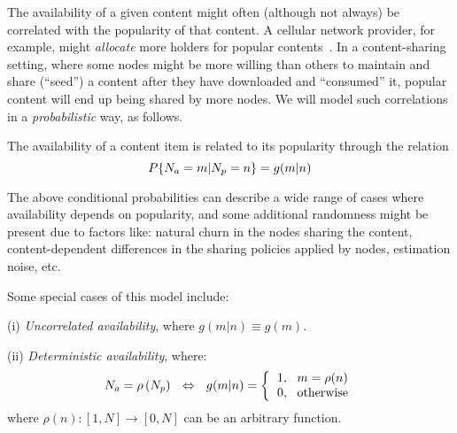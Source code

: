 \documentclass[journal]{IEEEtran}
\begin{document}
The availability of a given content might often (although not always) be correlated with the popularity of that content. A cellular network provider, for example, might \textit{allocate} more holders for popular contents~\cite{multiple-offloading}. In a content-sharing setting, where some nodes might be more willing than others to maintain and share (``seed'') a content after they have downloaded and ``consumed'' it, popular content will end up being shared by more nodes. We will model such correlations in a \textit{probabilistic} way, as follows.
\begin{definition}\label{def:avail-popul-relation-generic}
The availability of a content item is related to its popularity through the relation
\begin{equation}\label{eq:g_mn}
{P\lbrace N_{a} = m | N_{p} = n \rbrace = g(m|n)}
\end{equation}
\end{definition}
The above conditional probabilities can describe a wide range of cases where availability depends on popularity, and some additional randomness might be present due to factors like: natural churn in the nodes sharing the content, content-dependent differences in the sharing policies applied by nodes, estimation noise, etc.  

Some special cases of this model include: 

(i) \textit{Uncorrelated availability}, where $g(m|n) \equiv g(m)$. 

(ii) \textit{Deterministic availability}, where:
\begin{equation} N_{a} = \rho\left(N_{p}\right) ~~\Leftrightarrow~~ 
 g(m|n) = \bigg\{
\begin{tabular}{l}
$1,~~m=\rho(n)$\\
$0,~~\text{otherwise}$
\end{tabular}\nonumber
\end{equation}
where $\rho(n): [1,N] \rightarrow [0,N]$ can be an arbitrary function.  
\end{document}
